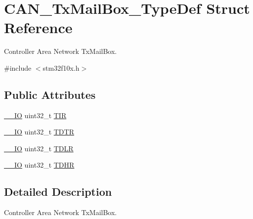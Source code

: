 \hypertarget{struct_c_a_n___tx_mail_box___type_def}{\section{C\-A\-N\-\_\-\-Tx\-Mail\-Box\-\_\-\-Type\-Def Struct Reference}
\label{struct_c_a_n___tx_mail_box___type_def}
}


Controller Area Network Tx\-Mail\-Box.  




{\ttfamily \#include $<$stm32f10x.\-h$>$}

\subsection*{Public Attributes}
\begin{DoxyCompactItemize}
\item 
\hyperlink{group___c_m_s_i_s__core__definitions_gaec43007d9998a0a0e01faede4133d6be}{\-\_\-\-\_\-\-I\-O} uint32\-\_\-t \hyperlink{struct_c_a_n___tx_mail_box___type_def_a22f525c909de2dcec1d4093fe1d562b8}{T\-I\-R}
\item 
\hyperlink{group___c_m_s_i_s__core__definitions_gaec43007d9998a0a0e01faede4133d6be}{\-\_\-\-\_\-\-I\-O} uint32\-\_\-t \hyperlink{struct_c_a_n___tx_mail_box___type_def_a2351cb865d064cf75f61642aaa887f76}{T\-D\-T\-R}
\item 
\hyperlink{group___c_m_s_i_s__core__definitions_gaec43007d9998a0a0e01faede4133d6be}{\-\_\-\-\_\-\-I\-O} uint32\-\_\-t \hyperlink{struct_c_a_n___tx_mail_box___type_def_a408c96501b1cc8bd527432736d132a39}{T\-D\-L\-R}
\item 
\hyperlink{group___c_m_s_i_s__core__definitions_gaec43007d9998a0a0e01faede4133d6be}{\-\_\-\-\_\-\-I\-O} uint32\-\_\-t \hyperlink{struct_c_a_n___tx_mail_box___type_def_a98c6bcd7c9bae378ebf83fd9f5b59020}{T\-D\-H\-R}
\end{DoxyCompactItemize}


\subsection{Detailed Description}
Controller Area Network Tx\-Mail\-Box. 

